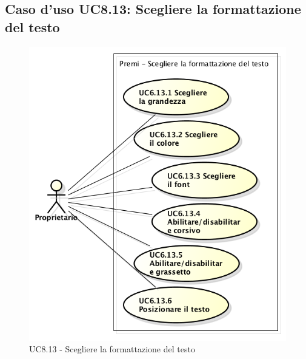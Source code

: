 \subsection{Caso d'uso UC8.13: Scegliere la formattazione del testo}
\begin{figure}[h] 
	\centering 
	\includegraphics[scale=0.45] {img/UC8.13.png} 
	\caption{UC8.13 - Scegliere la formattazione del testo}
\end{figure}

